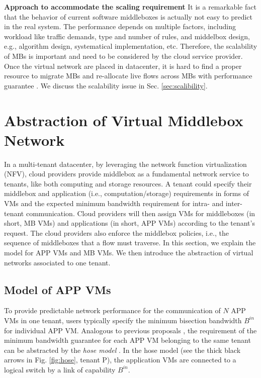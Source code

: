 \documentclass[review]{elsarticle}
\begin{document}
\textbf{Approach to accommodate the scaling requirement}
It is a remarkable fact that the behavior of current software middleboxes is actually not easy to predict in the real system. The performance depends on multiple factors, including workload like traffic demands, type and number of rules, and middelbox design, e.g., algorithm design, systematical implementation, etc. Therefore, the scalability of MBs is important and need to be considered by the cloud service provider. Once the virtual network are placed in datacenter, it is hard to find a proper resource to migrate MBs and re-allocate live flows across MBs with performance guarantee \cite{G13dio}. We discuss the scalability issue in Sec. \ref{sec:scalibility}.


\section{Abstraction of Virtual Middlebox Network}\label{sec:abstraction}
In a multi-tenant datacenter, by leveraging the network function virtualization (NFV), cloud providers provide middlebox as a fundamental network service to tenants, like both computing and storage resources. A tenant could specify their middlebox and application (i.e., computation/storage) requirements in forms of VMs and the expected minimum bandwidth requirement for intra- and inter-tenant communication. Cloud providers will then assign VMs for middleboxes (in short, MB VMs) and applications (in short, APP VMs) according to the tenant's request. The cloud providers also enforce the middlebox policies, i.e., the sequence of middleboxes that a flow must traverse. In this section, we explain the model for APP VMs and MB VMs. We then introduce the abstraction of virtual networks associated to one tenant.


\subsection{Model of APP VMs}
To provide predictable network performance for the communication of $N$ APP VMs in one tenant, users typically specify the minimum bisection bandwidth $B^{in}$ for individual APP VM. Analogous to previous proposals \cite{B13cta, P12fst}, the requirement of the minimum bandwidth guarantee for each APP VM belonging to the same tenant can be abstracted by the \emph{hose model} \cite{hose_model}. In the hose model (see the thick black arrows in Fig. \ref{fig:hose}, tenant P), the application VMs are connected to a logical switch by a link of capability $B^{in}$.
\end{document}
